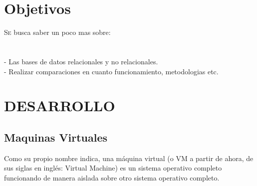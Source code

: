 \documentclass[twoside,twocolumn]{article}
\begin{document}
\section{Objetivos}
\begin{flushright}
\begin{itemize}
\lettrine[nindent=0em,lines=2]{S}e busca saber un poco mas sobre:
\\
\textbf{}\\
\textbf{}\\
- Las bases de datos relacionales y no relacionales.
\textbf{}\\
- Realizar comparaciones en cuanto funcionamiento, metodologias etc.







\section{DESARROLLO}

\subsection{Maquinas Virtuales}

Como su propio nombre indica, una máquina virtual (o VM a partir de ahora, de sus siglas en inglés: Virtual Machine) es un sistema operativo completo funcionando de manera aislada sobre otro sistema operativo completo.
\textbf{}\\


\end{itemize}
\end{flushright}
\end{document}
